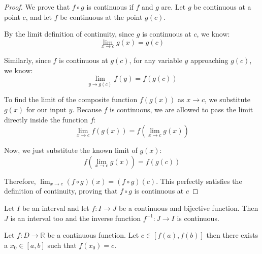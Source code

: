 \begin{proof}
    We prove that $f \circ g$ is continuous if $f$ and $g$ are.
    Let $g$ be continuous at a point $c$, and let $f$ be continuous at the point $g(c)$. 

    By the limit definition of continuity, since $g$ is continuous at $c$, we know:
    $$ \lim_{x \to c} g(x) = g(c) $$

    Similarly, since $f$ is continuous at $g(c)$, for any variable $y$ approaching $g(c)$, we know:
    $$ \lim_{y \to g(c)} f(y) = f(g(c)) $$

    To find the limit of the composite function $f(g(x))$ as $x \to c$, we substitute $g(x)$ for our input $y$. Because $f$ is continuous, we are allowed to pass the limit directly inside the function $f$:
    $$ \lim_{x \to c} f(g(x)) = f\left( \lim_{x \to c} g(x) \right) $$

    Now, we just substitute the known limit of $g(x)$:
    $$ f\left( \lim_{x \to c} g(x) \right) = f(g(c)) $$

    Therefore, $\lim_{x \to c} (f \circ g)(x) = (f \circ g)(c)$. This perfectly satisfies the definition of continuity, proving that $f \circ g$ is continuous at $c$
\end{proof}

\begin{theorem}
    Let $I$ be an interval and let $f: I \to J$ be a continuous and bijective function. Then $J$ is an interval too and the inverse function $f^{-1}: J \to I$ is continuous.
\end{theorem}

\begin{theorem}
    Let $f: D \to \mathbb{R}$ be a continuous function. Let $c \in [f(a), f(b)]$ then there exists a $x_0 \in [a, b]$ such that $f(x_0) = c$.
\end{theorem}

